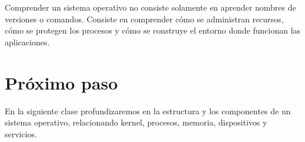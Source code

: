 \documentclass[
  spanish,
  letterpaper,
]{scrbook}
\begin{document}
\begin{tcolorbox}[enhanced jigsaw, arc=.35mm, bottomrule=.15mm, bottomtitle=1mm, breakable, colback=white, colbacktitle=quarto-callout-tip-color!10!white, colframe=quarto-callout-tip-color-frame, coltitle=black, left=2mm, leftrule=.75mm, opacityback=0, opacitybacktitle=0.6, rightrule=.15mm, title=\textcolor{quarto-callout-tip-color}{\faLightbulb}\hspace{0.5em}{Consejo final del Ingeniero}, titlerule=0mm, toprule=.15mm, toptitle=1mm]

Comprender un sistema operativo no consiste solamente en aprender
nombres de versiones o comandos. Consiste en comprender cómo se
administran recursos, cómo se protegen los procesos y cómo se construye
el entorno donde funcionan las aplicaciones.

\end{tcolorbox}

\section{Próximo paso}\label{pruxf3ximo-paso}

En la siguiente clase profundizaremos en la estructura y los componentes
de un sistema operativo, relacionando kernel, procesos, memoria,
dispositivos y servicios.


\backmatter
\end{document}
